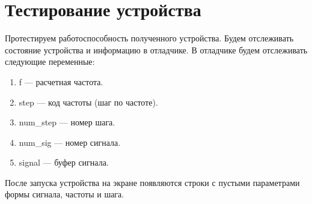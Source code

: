 \section{Тестирование устройства}
	
	Протестируем работоспособность полученного устройства. Будем отслеживать состояние устройства и информацию в отладчике. В отладчике будем отслеживать следующие переменные:
	\begin{enumerate}
	\item f --- расчетная частота.
	\item step --- код частоты (шаг по частоте).
	\item num\_step --- номер шага.
	\item num\_sig --- номер сигнала.
	\item signal --- буфер сигнала.
	\end{enumerate}		
	
	После запуска устройства на экране появляются строки с пустыми параметрами формы сигнала, частоты и шага. 


